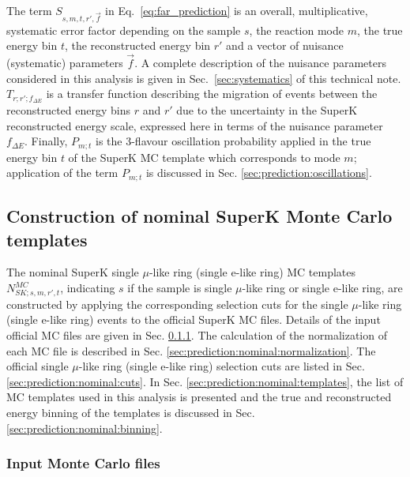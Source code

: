 The term $S_{s,m,t,r\prime,\vec{f}}$ in Eq.\ \ref{eq:far_prediction} is an overall, multiplicative, systematic error factor
depending on the sample $s$, the reaction mode $m$, the true energy bin $t$, the reconstructed energy bin $r\prime$
and a vector of nuisance (systematic) parameters $\vec{f}$.
A complete description of the nuisance parameters considered in this analysis is given in Sec.\ \ref{sec:systematics} of this technical note.
$T_{r;r\prime;f_{{\Delta}E}}$ is a transfer function describing the migration of events
between the reconstructed energy bins $r$ and $r\prime$ due to the uncertainty in the SuperK reconstructed energy
scale, expressed here in terms of the nuisance parameter $f_{{\Delta}E}$.
Finally, $P_{m;t}$ is the 3-flavour oscillation probability applied in the true energy
bin $t$ of the SuperK MC template which corresponds to mode $m$; application of the term
$P_{m;t}$ is discussed in Sec. \ref{sec:prediction:oscillations}.


\subsection{Construction of nominal SuperK Monte Carlo templates}
\label{sec:prediction:nominal}

The nominal SuperK single $\mu$-like ring (single e-like ring)
MC templates $N_{SK;s,m,r\prime,t}^{MC}$, indicating $s$ if the sample is single $\mu$-like ring or single e-like ring,
 are constructed by applying the corresponding selection cuts for the single $\mu$-like ring (single e-like ring) events 
to the official SuperK MC files. Details of the input official MC files are given in Sec. \ref{sec:prediction:nominal:input}.
The calculation of the normalization of each MC file is described in Sec. \ref{sec:prediction:nominal:normalization}.
The official single $\mu$-like ring (single e-like ring) selection cuts are listed in Sec. \ref{sec:prediction:nominal:cuts}.
In Sec. \ref{sec:prediction:nominal:templates}, the list of MC templates used in this analysis is presented and the true and 
reconstructed energy binning of the templates is discussed in Sec. \ref{sec:prediction:nominal:binning}.


\subsubsection{Input Monte Carlo files}
\label{sec:prediction:nominal:input}

